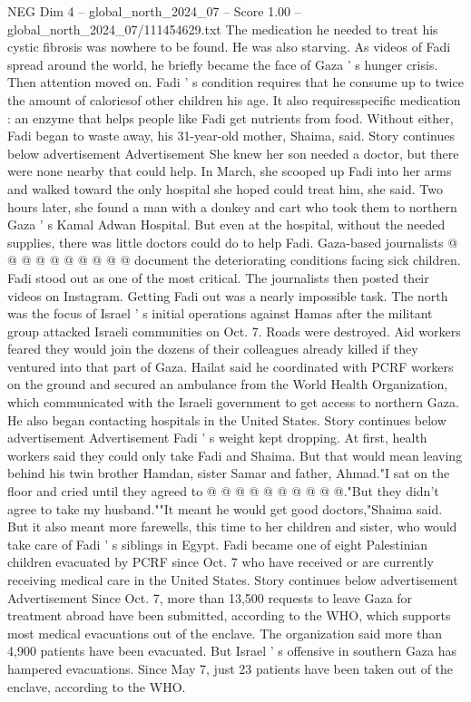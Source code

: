 \begin{textsample}{NEG Dim 4 – global\_north\_2024\_07 – Score 1.00 – global\_north\_2024\_07/111454629.txt}  \label{ex:f4_neg_266}
The medication he needed to treat his cystic fibrosis was nowhere to be found.
He was also starving.
As videos of Fadi spread around the world, he briefly became the face of Gaza ' s hunger crisis.
Then attention moved on.
Fadi ' s condition requires that he consume up to twice the amount of caloriesof other children his age.
It also requiresspecific medication : an enzyme that helps people like Fadi get nutrients from food.
Without either, Fadi began to waste away, his 31-year-old mother, Shaima, said.
Story continues below advertisement Advertisement She knew her son needed a doctor, but there were none nearby that could help.
In March, she scooped up Fadi into her arms and walked toward the only hospital she hoped could treat him, she said.
Two hours later, she found a man with a donkey and cart who took them to northern Gaza ' s Kamal Adwan Hospital.
But even at the hospital, without the needed supplies, there was little doctors could do to help Fadi.
Gaza-based journalists @ @ @ @ @ @ @ @ @ @ document the deteriorating conditions facing sick children.
Fadi stood out as one of the most critical.
The journalists then posted their videos on Instagram.
Getting Fadi out was a nearly impossible task.
The north was the focus of Israel ' s initial operations against Hamas after the militant group attacked Israeli communities on Oct. 7.
Roads were destroyed.
Aid workers feared they would join the dozens of their colleagues already killed if they ventured into that part of Gaza.
Hailat said he coordinated with PCRF workers on the ground and secured an ambulance from the World Health Organization, which communicated with the Israeli government to get access to northern Gaza.
He also began contacting hospitals in the United States.
Story continues below advertisement Advertisement Fadi ' s weight kept dropping.
At first, health workers said they could only take Fadi and Shaima.
But that would mean leaving behind his twin brother Hamdan, sister Samar and father, Ahmad."I sat on the floor and cried until they agreed to @ @ @ @ @ @ @ @ @ @."But they didn't agree to take my husband.""It meant he would get good doctors,"Shaima said.
But it also meant more farewells, this time to her children and sister, who would take care of Fadi ' s siblings in Egypt.
Fadi became one of eight Palestinian children evacuated by PCRF since Oct. 7 who have received or are currently receiving medical care in the United States.
Story continues below advertisement Advertisement Since Oct. 7, more than 13,500 requests to leave Gaza for treatment abroad have been submitted, according to the WHO, which supports most medical evacuations out of the enclave.
The organization said more than 4,900 patients have been evacuated.
But Israel ' s offensive in southern Gaza has hampered evacuations.
Since May 7, just 23 patients have been taken out of the enclave, according to the WHO.

\end{textsample}
